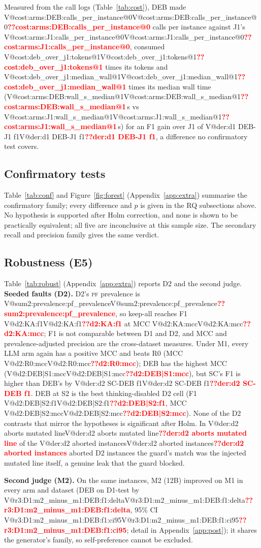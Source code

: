 \documentclass[pdflatex,iicol,sn-mathphys-num]{sn-jnl}
\makeatletter
\newcommand{\V}[1]{\ifcsname V@#1\endcsname\csname V@#1\endcsname\else\textbf{\textcolor{red}{??#1}}\fi}
\newcommand{\PF}{\textsc{pf}}
\makeatother
\begin{document}
Measured from the call logs (Table~\ref{tab:cost}), DEB made \V{cost:arms:DEB:calls_per_instance@0} calls per instance against J1's \V{cost:arms:J1:calls_per_instance@0}, consumed \V{cost:deb_over_j1:tokens@1} times its tokens and \V{cost:deb_over_j1:median_wall@1} times its median wall time (\V{cost:arms:DEB:wall_s_median@1}\,s vs \V{cost:arms:J1:wall_s_median@1}\,s) for an F1 gain over J1 of \V{der:d1 DEB-J1 f1}, a difference no confirmatory test covers.

\subsection{Confirmatory tests}
Table~\ref{tab:conf} and Figure~\ref{fig:forest} (Appendix~\ref{app:extra}) summarise the confirmatory family; every difference and $p$ is given in the RQ subsections above. No hypothesis is supported after Holm correction, and none is shown to be practically equivalent; all five are inconclusive at this sample size. The secondary recall and precision family gives the same verdict.



\subsection{Robustness (E5)}\label{sec:robust}
Table~\ref{tab:robust} (Appendix~\ref{app:extra}) reports D2 and the second judge. \textbf{Seeded faults (D2).} D2's \PF{} prevalence is \V{sum2:prevalence:pf_prevalence}, so keep-all reaches F1 \V{d2:KA:f1} at MCC \V{d2:KA:mcc}; F1 is not comparable between D1 and D2, and MCC and prevalence-adjusted precision are the cross-dataset measures. Under M1, every LLM arm again has a positive MCC and beats R0 (MCC \V{d2:R0:mcc}); DEB has the highest MCC (\V{d2:DEB|S1:mcc}), but SC's F1 is higher than DEB's by \V{der:d2 SC-DEB f1}. DEB at S2 is the best thinking-disabled D2 cell (F1 \V{d2:DEB|S2:f1}, MCC \V{d2:DEB|S2:mcc}). None of the D2 contrasts that mirror the hypotheses is significant after Holm. In \V{der:d2 aborts mutated line} of the \V{der:d2 aborted instances} aborted D2 instances the guard's match was the injected mutated line itself, a genuine leak that the guard blocked.

\textbf{Second judge (M2).} On the same instances, M2 (12B) improved on M1 in every arm and dataset (DEB on D1-test by \V{r3:D1:m2_minus_m1:DEB:f1:delta}, 95\% CI \V{r3:D1:m2_minus_m1:DEB:f1:ci95}; detail in Appendix~\ref{app:post}); it shares the generator's family, so self-preference cannot be excluded.
\end{document}
